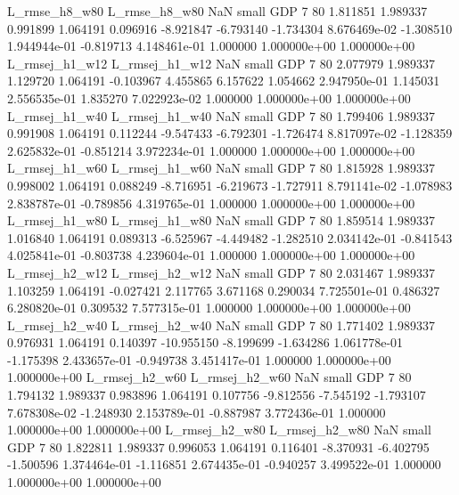  L_rmse_h8_w80  L_rmse_h8_w80                   NaN      small      GDP                 7 80 1.811851       1.989337 0.991899       1.064191    0.096916     -8.921847     -6.793140    -1.734304   8.676469e-02 -1.308510 1.944944e-01    -0.819713   4.148461e-01            1.000000    1.000000e+00        1.000000e+00
L_rmsej_h1_w12 L_rmsej_h1_w12                   NaN      small      GDP                 7 80 2.077979       1.989337 1.129720       1.064191   -0.103967      4.455865      6.157622     1.054662   2.947950e-01  1.145031 2.556535e-01     1.835270   7.022923e-02            1.000000    1.000000e+00        1.000000e+00
L_rmsej_h1_w40 L_rmsej_h1_w40                   NaN      small      GDP                 7 80 1.799406       1.989337 0.991908       1.064191    0.112244     -9.547433     -6.792301    -1.726474   8.817097e-02 -1.128359 2.625832e-01    -0.851214   3.972234e-01            1.000000    1.000000e+00        1.000000e+00
L_rmsej_h1_w60 L_rmsej_h1_w60                   NaN      small      GDP                 7 80 1.815928       1.989337 0.998002       1.064191    0.088249     -8.716951     -6.219673    -1.727911   8.791141e-02 -1.078983 2.838787e-01    -0.789856   4.319765e-01            1.000000    1.000000e+00        1.000000e+00
L_rmsej_h1_w80 L_rmsej_h1_w80                   NaN      small      GDP                 7 80 1.859514       1.989337 1.016840       1.064191    0.089313     -6.525967     -4.449482    -1.282510   2.034142e-01 -0.841543 4.025841e-01    -0.803738   4.239604e-01            1.000000    1.000000e+00        1.000000e+00
L_rmsej_h2_w12 L_rmsej_h2_w12                   NaN      small      GDP                 7 80 2.031467       1.989337 1.103259       1.064191   -0.027421      2.117765      3.671168     0.290034   7.725501e-01  0.486327 6.280820e-01     0.309532   7.577315e-01            1.000000    1.000000e+00        1.000000e+00
L_rmsej_h2_w40 L_rmsej_h2_w40                   NaN      small      GDP                 7 80 1.771402       1.989337 0.976931       1.064191    0.140397    -10.955150     -8.199699    -1.634286   1.061778e-01 -1.175398 2.433657e-01    -0.949738   3.451417e-01            1.000000    1.000000e+00        1.000000e+00
L_rmsej_h2_w60 L_rmsej_h2_w60                   NaN      small      GDP                 7 80 1.794132       1.989337 0.983896       1.064191    0.107756     -9.812556     -7.545192    -1.793107   7.678308e-02 -1.248930 2.153789e-01    -0.887987   3.772436e-01            1.000000    1.000000e+00        1.000000e+00
L_rmsej_h2_w80 L_rmsej_h2_w80                   NaN      small      GDP                 7 80 1.822811       1.989337 0.996053       1.064191    0.116401     -8.370931     -6.402795    -1.500596   1.374464e-01 -1.116851 2.674435e-01    -0.940257   3.499522e-01            1.000000    1.000000e+00        1.000000e+00
